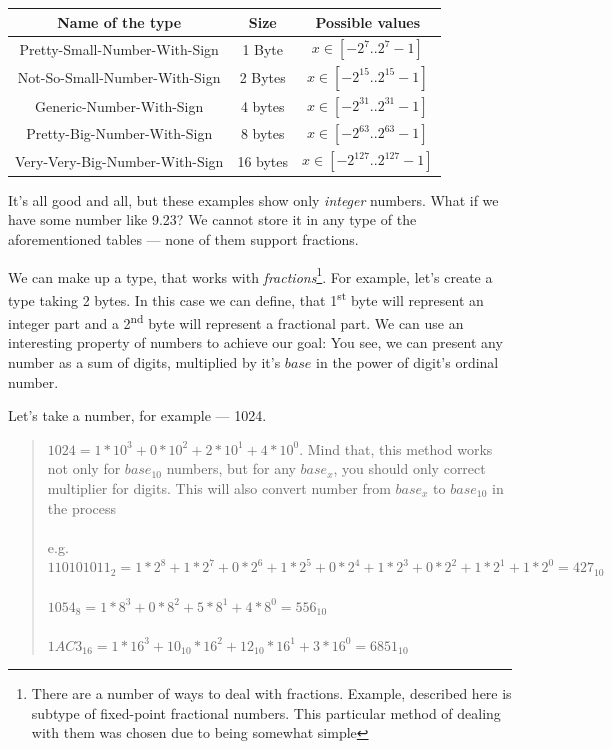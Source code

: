 \documentclass{article}
\begin{document}
            \begin{longtable}{|c|c|c|}
                \hline
                Name of the type & Size & Possible values \\\hline
                Pretty-Small-Number-With-Sign & 1 Byte & $x \in [-2^7..2^7 - 1]$ \\\hline
                Not-So-Small-Number-With-Sign & 2 Bytes & $x \in [-2^{15}..2^{15} - 1]$\\\hline
                Generic-Number-With-Sign & 4 bytes & $x \in [-2^{31}..2^{31} - 1]$\\\hline
                Pretty-Big-Number-With-Sign & 8 bytes & $x \in [-2^{63}..2^{63} - 1]$\\\hline
                Very-Very-Big-Number-With-Sign & 16 bytes & $x \in [-2^{127}..2^{127} - 1]$\\\hline
            \end{longtable}

            It's all good and all, but these examples show only \emph{integer} numbers. What if we have some number like 9.23?
            We cannot store it in any type of the aforementioned tables --- none of them support fractions. \par

            We can make up a type, that works with \emph{fractions}\footnote{There are a number of ways to deal with fractions. 
            Example, described here is subtype of fixed-point fractional numbers. This particular method of dealing with them was chosen due to being somewhat simple}. 
            For example, let's create a type taking 2 bytes. In this case we can define, that 1\textsuperscript{st} byte will represent an integer part and a 2\textsuperscript{nd}
            byte will represent a fractional part. We can use an interesting property of numbers to achieve our goal: You see, we can present any number as a sum of digits,
            multiplied by it's \emph{$base$} in the power of digit's ordinal number. \par
            
            Let's take a number, for example --- 1024. 
            
            \begin{quote}
                $1024 = 1 * 10^3 + 0 * 10^2 + 2 * 10^1 + 4 * 10^0$. Mind that, this method works not only for $base_{10}$ numbers, but for any $base_x$, you should only correct
                multiplier for digits. This will also convert number from $base_x$ to $base_{10}$ in the process\\\\
                e.g.\\
                $110101011_2 = 1 * 2^8 + 1 * 2^7 + 0 * 2^6 + 1 * 2^5 + 0 * 2^4 + 1 * 2^3 + 0 * 2^2 + 1 * 2^1 + 1 * 2^0 = 427_{10}$ \\\\                    
                $1054_8 = 1 * 8^3 + 0 * 8^2 + 5 * 8^1 + 4 * 8^0 = 556_{10}$\\\\
                $1AC3_{16} = 1 * 16^3 + 10_{10} * 16^2 + 12_{10} * 16^1 + 3 * 16^0 = 6851_{10}$
            \end{quote}
\end{document}
